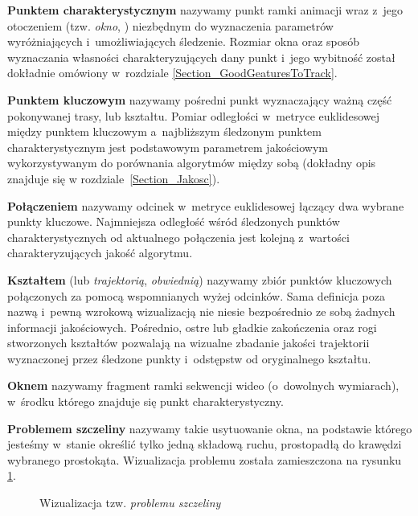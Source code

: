     \textbf{Punktem charakterystycznym} nazywamy punkt ramki animacji wraz z~jego otoczeniem (tzw. \textit{okno}, \cite{SalientPointsTracking05}) niezbędnym do wyznaczenia parametrów wyróżniających i~umożliwiających śledzenie. Rozmiar okna oraz sposób wyznaczania własności charakteryzujących dany punkt i~jego wybitność został dokładnie omówiony w~rozdziale \ref{Section_GoodGeaturesToTrack}.

    \textbf{Punktem kluczowym} nazywamy pośredni punkt wyznaczający ważną część pokonywanej trasy, lub kształtu. Pomiar odległości w~metryce euklidesowej między punktem kluczowym a~najbliższym śledzonym punktem charakterystycznym jest podstawowym parametrem jakościowym wykorzystywanym do porównania algorytmów między sobą (dokładny opis znajduje się w rozdziale~\ref{Section_Jakosc}).

    \textbf{Połączeniem} nazywamy odcinek w~metryce euklidesowej łączący dwa wybrane punkty kluczowe. Najmniejsza odległość wśród śledzonych punktów charakterystycznych od aktualnego połączenia jest kolejną z~wartości charakteryzujących jakość algorytmu.

    \textbf{Kształtem} (lub \textit{trajektorią}, \textit{obwiednią}) nazywamy zbiór punktów kluczowych połączonych za pomocą wspomnianych wyżej odcinków. Sama definicja poza nazwą i~pewną wzrokową wizualizacją nie niesie bezpośrednio ze sobą żadnych informacji jakościowych. Pośrednio, ostre lub gładkie zakończenia oraz rogi stworzonych kształtów pozwalają na wizualne zbadanie jakości trajektorii wyznaczonej przez śledzone punkty i~odstępstw od oryginalnego kształtu.

    \textbf{Oknem} nazywamy fragment ramki sekwencji wideo (o~dowolnych wymiarach), w~środku którego znajduje się punkt charakterystyczny.

    \textbf{Problemem szczeliny} nazywamy takie usytuowanie okna, na podstawie którego jesteśmy w~stanie określić tylko jedną składową ruchu, prostopadłą do krawędzi wybranego prostokąta. Wizualizacja problemu została zamieszczona na rysunku \ref{fig:ApertureProblem}.

    \begin{figure}[!ht]
      \centering
      \caption[Wizualizacja tzw. problemu szczeliny]{Wizualizacja tzw. \textit{problemu szczeliny}}
      \label{fig:ApertureProblem}
    \end{figure}


